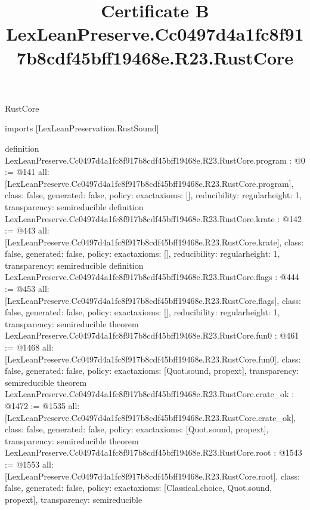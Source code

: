 \begin{lexlean}{RustCore}
\title{Certificate B LexLeanPreserve.Cc0497d4a1fc8f917b8cdf45bff19468e.R23.RustCore}
\begin{coremodule}
imports [LexLeanPreservation.RustSound]

definition LexLeanPreserve.Cc0497d4a1fc8f917b8cdf45bff19468e.R23.RustCore.program : @0 := @141 {
  all: [LexLeanPreserve.Cc0497d4a1fc8f917b8cdf45bff19468e.R23.RustCore.program],
  class: false,
  generated: false,
  policy: exact{axioms: []},
  reducibility: regular{height: 1},
  transparency: semireducible
}
definition LexLeanPreserve.Cc0497d4a1fc8f917b8cdf45bff19468e.R23.RustCore.krate : @142 := @443 {
  all: [LexLeanPreserve.Cc0497d4a1fc8f917b8cdf45bff19468e.R23.RustCore.krate],
  class: false,
  generated: false,
  policy: exact{axioms: []},
  reducibility: regular{height: 1},
  transparency: semireducible
}
definition LexLeanPreserve.Cc0497d4a1fc8f917b8cdf45bff19468e.R23.RustCore.flags : @444 := @453 {
  all: [LexLeanPreserve.Cc0497d4a1fc8f917b8cdf45bff19468e.R23.RustCore.flags],
  class: false,
  generated: false,
  policy: exact{axioms: []},
  reducibility: regular{height: 1},
  transparency: semireducible
}
theorem LexLeanPreserve.Cc0497d4a1fc8f917b8cdf45bff19468e.R23.RustCore.fun0 : @461 := @1468 {
  all: [LexLeanPreserve.Cc0497d4a1fc8f917b8cdf45bff19468e.R23.RustCore.fun0],
  class: false,
  generated: false,
  policy: exact{axioms: [Quot.sound, propext]},
  transparency: semireducible
}
theorem LexLeanPreserve.Cc0497d4a1fc8f917b8cdf45bff19468e.R23.RustCore.crate_ok : @1472 := @1535 {
  all: [LexLeanPreserve.Cc0497d4a1fc8f917b8cdf45bff19468e.R23.RustCore.crate_ok],
  class: false,
  generated: false,
  policy: exact{axioms: [Quot.sound, propext]},
  transparency: semireducible
}
theorem LexLeanPreserve.Cc0497d4a1fc8f917b8cdf45bff19468e.R23.RustCore.root : @1543 := @1553 {
  all: [LexLeanPreserve.Cc0497d4a1fc8f917b8cdf45bff19468e.R23.RustCore.root],
  class: false,
  generated: false,
  policy: exact{axioms: [Classical.choice, Quot.sound, propext]},
  transparency: semireducible
}


\end{coremodule}
\end{lexlean}
